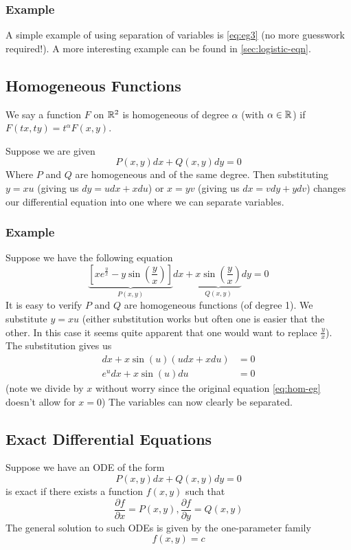 \subsubsection{Example}
A simple example of using separation of variables is \autoref{eq:eg3} (no more guesswork required!). A more interesting example can be found in \autoref{sec:logistic-eqn}.

\subsection{Homogeneous Functions}
We say a function $F$ on $\mathbb{R}^2$ is homogeneous of degree $\alpha$ (with $\alpha \in \mathbb{R}$) if $F(tx, ty) = t^\alpha F(x, y)$.

Suppose we are given
\begin{equation}
    P(x, y) dx + Q(x, y) dy = 0
\end{equation}
Where $P$ and $Q$ are homogeneous and of the same degree. Then substituting $y = xu$ (giving us $dy = u dx + x du$) or $x = yv$ (giving us $dx = v dy + y dv$) changes our differential equation into one where we can separate variables.

\subsubsection{Example}
Suppose we have the following equation
\begin{equation}\label{eq:hom-eg}
    \underbrace{\left[ x e^{\frac{y}{x}} - y \sin \left(\frac{y}{x} \right) \right]}_{P(x, y)} dx + \underbrace{x \sin\left( \frac{y}{x} \right)}_{Q(x,y)} dy = 0
\end{equation}
It is easy to verify $P$ and $Q$ are homogeneous functions (of degree 1). We substitute $y = xu$ (either substitution works but often one is easier that the other. In this case it seems quite apparent that one would want to replace $\frac{y}{x}$). The substitution gives us
\begin{align*}
    [xe^u - xu \sin(u)] dx + x \sin(u)(u dx + x du) &= 0\\
    e^u dx + x \sin(u) du &= 0
\end{align*}
(note we divide by $x$ without worry since the original equation \autoref{eq:hom-eg} doesn't allow for $x = 0$)
The variables can now clearly be separated.

\subsection{Exact Differential Equations}\label{sec:exact-diff-eq}
Suppose we have an ODE of the form
$$ P(x, y)dx + Q(x, y)dy = 0 $$
is exact if there exists a function $f(x, y)$ such that
$$ \frac{\partial f}{\partial x} = P(x, y), \frac{\partial f}{\partial y} = Q(x, y) $$
The general solution to such ODEs is given by the one-parameter family
$$ f(x, y) = c $$

